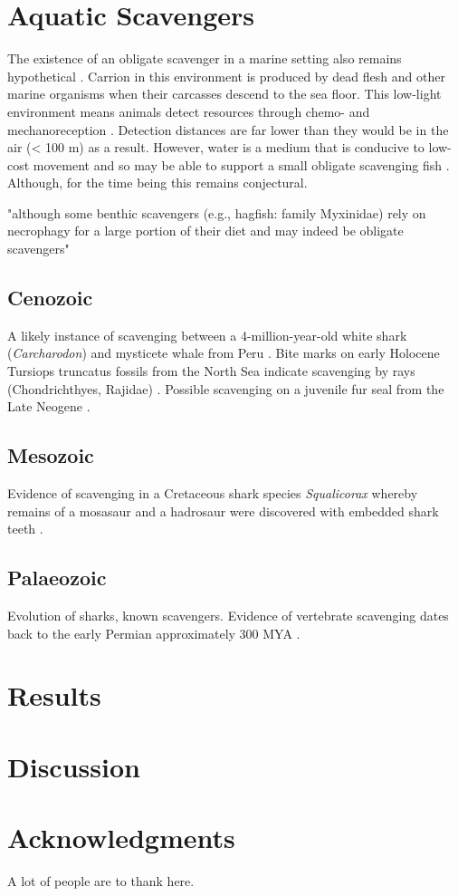 \documentclass[a4paper,12pt]{article}
\begin{document}
\section{Aquatic Scavengers}
The existence of an obligate scavenger in a marine setting also remains hypothetical \citep{britton1994marine,smith2003ecology,ruxton2004energetic,ruxton2005searching}. 
Carrion in this environment is produced by dead flesh and other marine organisms when their carcasses descend to the sea floor. 
This low-light environment means animals detect resources through chemo- and mechanoreception \citep{ruxton2004energetic}. 
Detection distances are far lower than they would be in the air (< 100 m) as a result. 
However, water is a medium that is conducive to low-cost movement \citep{tucker1975energetic} and so may be able to support a small obligate scavenging fish \citep{ruxton2004energetic,ruxton2005searching}. 
Although, for the time being this remains conjectural.

"although some benthic scavengers (e.g., hagfish: family Myxinidae) rely on necrophagy for a large portion of their diet and may indeed be obligate scavengers" \citep{benbow2015introduction}

\subsection*{Cenozoic}
A likely instance of scavenging between a 4-million-year-old white shark (\textit{Carcharodon}) and mysticete whale from Peru \citep{ehret2009caught}.
Bite marks on early Holocene Tursiops truncatus fossils from the North Sea indicate scavenging by rays (Chondrichthyes, Rajidae) \citep{van2009bite}. 
Possible scavenging on a juvenile fur seal from the Late Neogene \citep{boessenecker2011mammalian}. 

\subsection*{Mesozoic}
Evidence of scavenging in a Cretaceous shark species \textit{Squalicorax} whereby remains of a mosasaur and a hadrosaur were discovered with embedded shark teeth \citep{schwimmer1997scavenging}. 
\subsection*{Palaeozoic}
Evolution of sharks, known scavengers. 
Evidence of vertebrate scavenging dates back to the early Permian approximately 300 MYA \citep{reisz2006articulated}.




\section*{Results}




\section*{Discussion}



\section*{Acknowledgments}

A lot of people are to thank here.


\newpage



\end{document}
